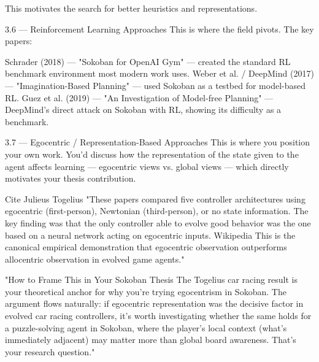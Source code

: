 This motivates the search for better heuristics and representations.




3.6 — Reinforcement Learning Approaches
This is where the field pivots. The key papers:

Schrader (2018) — "Sokoban for OpenAI Gym" — created the standard RL benchmark environment most modern work uses.
Weber et al. / DeepMind (2017) — "Imagination-Based Planning" — used Sokoban as a testbed for model-based RL.
Guez et al. (2019) — "An Investigation of Model-free Planning" — DeepMind's direct attack on Sokoban with RL, showing its difficulty as a benchmark.


3.7 — Egocentric / Representation-Based Approaches
This is where you position your own work. You'd discuss how the representation of the state given to the agent affects learning — egocentric views vs. global views — which directly motivates your thesis contribution.

Cite Julieus Togelius \cite{togelius2005evolving} \cite{togelius2006evolving}
"These papers compared five controller architectures using egocentric (first-person), Newtonian (third-person), or no state information. The key finding was that the only controller able to evolve good behavior was the one based on a neural network acting on egocentric inputs. Wikipedia This is the canonical empirical demonstration that egocentric observation outperforms allocentric observation in evolved game agents."
\cite{risi2015neuroevolution}

"How to Frame This in Your Sokoban Thesis
The Togelius car racing result is your theoretical anchor for why you're trying egocentrism in Sokoban. The argument flows naturally: if egocentric representation was the decisive factor in evolved car racing controllers, it's worth investigating whether the same holds for a puzzle-solving agent in Sokoban, where the player's local context (what's immediately adjacent) may matter more than global board awareness. That's your research question."